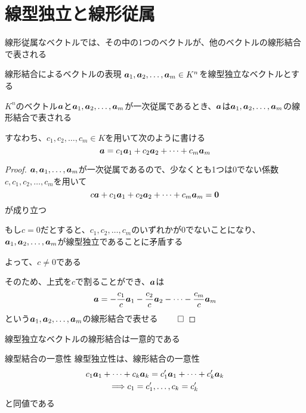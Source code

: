 \documentclass[../../../topic_linear-algebra]{subfiles}
\begin{document}
\sectionline
\section{線型独立と線形従属}

線形従属なベクトルでは、その中の1つのベクトルが、他のベクトルの線形結合で表される

\begin{theorem}{線形結合によるベクトルの表現}
  $\vb*{a}_1, \vb*{a}_2, \dots, \vb*{a}_m \in K^n$を線型独立なベクトルとする

  $K^n$のベクトル$\vb*{a}$と$\vb*{a}_1, \vb*{a}_2, \dots, \vb*{a}_m$が一次従属であるとき、$\vb*{a}$は$\vb*{a}_1, \vb*{a}_2, \dots, \vb*{a}_m$の線形結合で表される

  すなわち、$c_1, c_2, \dots, c_m \in K$を用いて次のように書ける
  \begin{equation*}
    \vb*{a} = c_1 \vb*{a}_1 + c_2 \vb*{a}_2 + \cdots + c_m \vb*{a}_m
  \end{equation*}
\end{theorem}

\begin{proof}
  $\vb*{a}, \vb*{a}_1,\dots, \vb*{a}_m$が一次従属であるので、少なくとも1つは0でない係数$c, c_1, c_2, \dots, c_m$を用いて
  \begin{equation*}
    c \vb*{a} + c_1 \vb*{a}_1 + c_2 \vb*{a}_2 + \cdots + c_m \vb*{a}_m = \vb*{0}
  \end{equation*}
  が成り立つ

  もし$c=0$だとすると、$c_1,c_2,\dots,c_m$のいずれかが0でないことになり、$\vb*{a}_1, \vb*{a}_2, \dots, \vb*{a}_m$が線型独立であることに矛盾する

  よって、$c \neq 0$である

  そのため、上式を$c$で割ることができ、$\vb*{a}$は
  \begin{equation*}
    \vb*{a} = -\frac{c_1}{c} \vb*{a}_1 - \frac{c_2}{c} \vb*{a}_2 - \cdots - \frac{c_m}{c} \vb*{a}_m
  \end{equation*}
  という$\vb*{a}_1, \vb*{a}_2, \dots, \vb*{a}_m$の線形結合で表せる $\qed$
\end{proof}

\sectionline

線型独立なベクトルの線形結合は一意的である

\begin{theorem}{線型結合の一意性}
  線型独立性は、線形結合の一意性
  \begin{gather*}
    c_1 \vb*{a}_1 + \cdots + c_k \vb*{a}_k = c'_1 \vb*{a}_1 + \cdots + c'_k \vb*{a}_k \\ \Longrightarrow c_1 = c'_1, \dots, c_k = c'_k
  \end{gather*}
  と同値である
\end{theorem}
\end{document}
